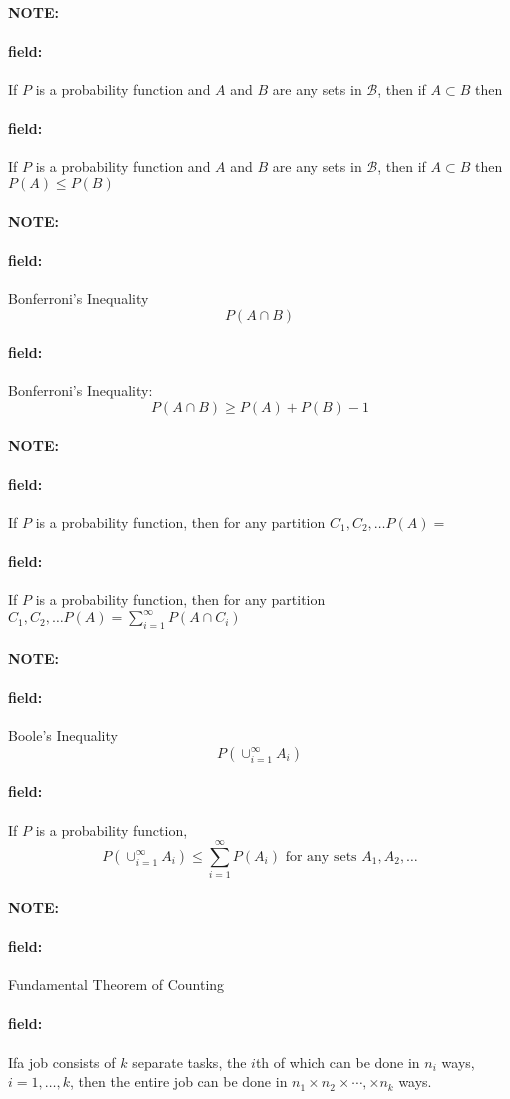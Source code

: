 \documentclass[12pt]{article}
\newenvironment{note}{\paragraph{NOTE:}}{}
\newenvironment{field}{\paragraph{field:}}{}
\begin{document}
\begin{note}
    \begin{field}
        If $P$ is a probability function and $A$ and $B$ are any sets in $\mathcal{B}$, then if $A \subset B$ then
    \end{field}
    \begin{field}
        If $P$ is a probability function and $A$ and $B$ are any sets in $\mathcal{B}$, then if $A \subset B$ then $P(A) \leq P(B)$
    \end{field}
\end{note}

\begin{note}
    \begin{field}
        Bonferroni's Inequality
        $$P(A\cap B)  $$
    \end{field}
    \begin{field}
      Bonferroni's Inequality:
        $$P(A\cap B) \geq P(A) + P(B) -1 $$
    \end{field}
\end{note}

\begin{note}
    \begin{field}
        If $P$ is a probability function, then for any partition $C_1, C_2, \ldots P(A) = $
    \end{field}
    \begin{field}
        If $P$ is a probability function, then for any partition $C_1, C_2, \ldots P(A) = \sum_{i=1}^\infty P(A \cap C_i)$
    \end{field}
\end{note}

\begin{note}
    \begin{field}
        Boole's Inequality
        $$P(\cup_{i=1}^\infty A_i)$$
    \end{field}
    \begin{field}
        If $P$ is a probability function,
            $$P(\cup_{i=1}^\infty A_i) \leq \sum_{i=1}^\infty P(A_i) \text{ for any sets } A_1, A_2, \ldots $$
    \end{field}
\end{note}

\begin{note}
    \begin{field}
        Fundamental Theorem of Counting
    \end{field}
    \begin{field}
        Ifa job consists of $k$ separate tasks, the $i$th of which can be done in $n_i$ ways, $i = 1, \ldots, k$, then the entire job can be done in $n_1 \times n_2 \times \cdots, \times n_k$ ways.
    \end{field}
\end{note}
\end{document}
